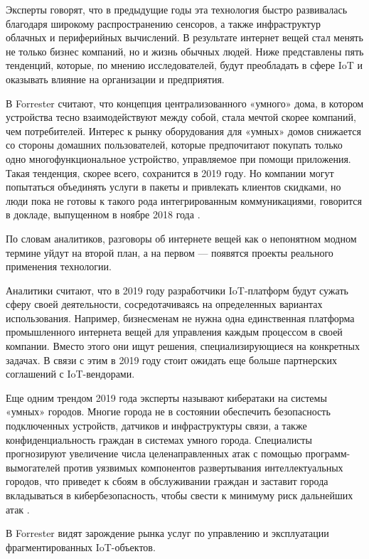 Эксперты говорят, что в предыдущие годы эта технология быстро развивалась благодаря широкому распространению сенсоров, а также инфраструктур облачных и периферийных вычислений. В результате интернет вещей стал менять не только бизнес компаний, но и жизнь обычных людей. Ниже представлены пять тенденций, которые, по мнению исследователей, будут преобладать в сфере IoT и оказывать влияние на организации и предприятия.

В Forrester считают, что концепция централизованного «умного» дома, в котором устройства тесно взаимодействуют между собой, стала мечтой скорее компаний, чем потребителей. Интерес к рынку оборудования для «умных» домов снижается со стороны домашних пользователей, которые предпочитают покупать только одно многофункциональное устройство, управляемое при помощи приложения. Такая тенденция, скорее всего, сохранится в 2019 году. Но компании могут попытаться объединять услуги в пакеты и привлекать клиентов скидками, но люди пока не готовы к такого рода интегрированным коммуникациями, говорится в докладе, выпущенном в ноябре 2018 года \cite{iot_data_2019}.

По словам аналитиков, разговоры об интернете вещей как о непонятном модном термине уйдут на второй план, а на первом — появятся проекты реального применения технологии.

Аналитики считают, что в 2019 году разработчики IoT-платформ будут сужать сферу своей деятельности, сосредотачиваясь на определенных вариантах использования. Например, бизнесменам не нужна одна единственная платформа промышленного интернета вещей для управления каждым процессом в своей компании. Вместо этого они ищут решения, специализирующиеся на конкретных задачах. В связи с этим в 2019 году стоит ожидать еще больше партнерских соглашений с IoT-вендорами.

Еще одним трендом 2019 года эксперты называют кибератаки на системы «умных» городов. Многие города не в состоянии обеспечить безопасность подключенных устройств, датчиков и инфраструктуры связи, а также конфиденциальность граждан в системах умного города. Специалисты прогнозируют увеличение числа целенаправленных атак с помощью программ-вымогателей против уязвимых компонентов развертывания интеллектуальных городов, что приведет к сбоям в обслуживании граждан и заставит города вкладываться в кибербезопасность, чтобы свести к минимуму риск дальнейших атак \cite{iot_data_2019}.

В Forrester видят зарождение рынка услуг по управлению и эксплуатации фрагментированных IoT-объектов.